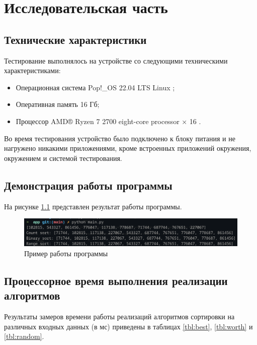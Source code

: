 \chapter{Исследовательская часть}
\section{Технические характеристики}
Тестирование выполнялось на устройстве со следующими техническими характеристиками:
\begin{itemize}
	\item Операционная система Pop!\_OS 22.04 LTS \cite{ubuntu} Linux \cite{linux};
	\item Оперативная память 16 Гб;
	\item Процессор AMD® Ryzen 7 2700 eight-core processor × 16 \cite{amd}.
\end{itemize}
Во время тестирования устройство было подключено к блоку питания и не нагружено никакими приложениями, кроме встроенных приложений окружения, окружением и системой тестирования.

\section{Демонстрация работы программы}



На рисунке \ref{demonstration} представлен результат работы программы.

\begin{figure}[ht!]
	\begin{center}
		\captionsetup{singlelinecheck = false, justification=centerfirst}
		\includegraphics[scale=0.8]{assets/demonstation.png}
		\caption{Пример работы программы}
		\label{demonstration}
	\end{center}
	
	
\end{figure}

\newpage

\section{Процессорное время выполнения реализации алгоритмов}

Результаты замеров времени работы реализаций алгоритмов сортировки на различных входных данных (в мс) приведены в таблицах \ref{tbl:best}, \ref{tbl:worth} и \ref{tbl:random}.

